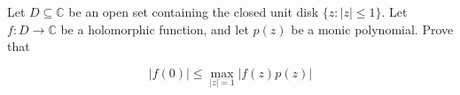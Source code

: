 Let $D \subseteq \mathbb{C}$ be an open set containing the closed unit disk $\{z : |z| \leq 1\}$. Let $f : D \rightarrow \mathbb{C}$ be a holomorphic function, and let $p(z)$ be a monic polynomial. Prove that

$$
|f(0)| \leq \max_{|z|=1} |f(z)p(z)|
$$